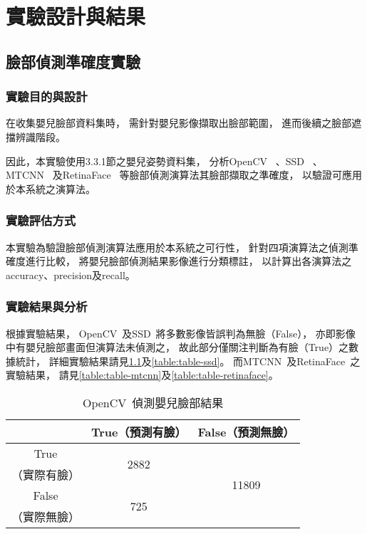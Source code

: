 \documentclass[class=NCU_thesis, crop=false]{standalone}
\begin{document}
\chapter{實驗設計與結果}

\section{臉部偵測準確度實驗}
\subsection{實驗目的與設計}
在收集嬰兒臉部資料集時，
需針對嬰兒影像擷取出臉部範圍，
進而後續之臉部遮擋辨識階段。

因此，本實驗使用3.3.1節之嬰兒姿勢資料集，
分析OpenCV~\cite{goyal_face_2017}
、SSD~\cite{ye_face_2021}
、MTCNN~\cite{zhang_joint_2016}
及RetinaFace~\cite{deng_retinaface_2020}
等臉部偵測演算法其臉部擷取之準確度，
以驗證可應用於本系統之演算法。

\subsection{實驗評估方式}
本實驗為驗證臉部偵測演算法應用於本系統之可行性，
針對四項演算法之偵測準確度進行比較，
將嬰兒臉部偵測結果影像進行分類標註，
以計算出各演算法之accuracy、precision及recall。

\subsection{實驗結果與分析}
根據實驗結果，
OpenCV~\cite{goyal_face_2017}及SSD~\cite{ye_face_2021}將多數影像皆誤判為無臉（False），
亦即影像中有嬰兒臉部畫面但演算法未偵測之，
故此部分僅關注判斷為有臉（True）之數據統計，
詳細實驗結果請見\cref{table:table-opencv}及\cref{table:table-ssd}。
而MTCNN~\cite{zhang_joint_2016}及RetinaFace~\cite{deng_retinaface_2020}之實驗結果，
請見\cref{table:table-mtcnn}及\cref{table:table-retinaface}。
\begin{table}[h]
    \centering
    \caption{OpenCV~\cite{goyal_face_2017}偵測嬰兒臉部結果}
    \label{table:table-opencv}
    \begin{tabular}{ccc}
    \hline
     & True（預測有臉）& False（預測無臉）\\
    \hline
    True & \multirow{2}{*}{2882} & \multirow{4}{*}{11809} \\
    （實際有臉）& & \\
    False & \multirow{2}{*}{725} & \\
    （實際無臉）&  & \\
    \hline
    \end{tabular}
\end{table}
\end{document}
